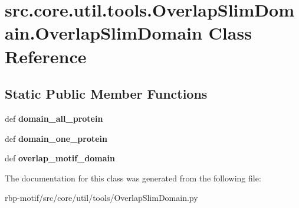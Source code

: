 \hypertarget{classsrc_1_1core_1_1util_1_1tools_1_1OverlapSlimDomain_1_1OverlapSlimDomain}{\section{src.\-core.\-util.\-tools.\-Overlap\-Slim\-Domain.\-Overlap\-Slim\-Domain Class Reference}
\label{classsrc_1_1core_1_1util_1_1tools_1_1OverlapSlimDomain_1_1OverlapSlimDomain}
}
\subsection*{Static Public Member Functions}
\begin{DoxyCompactItemize}
\item 
\hypertarget{classsrc_1_1core_1_1util_1_1tools_1_1OverlapSlimDomain_1_1OverlapSlimDomain_a35e8d3b7e4ba564c9db6f340cb02a3b6}{def {\bfseries domain\-\_\-all\-\_\-protein}}\label{classsrc_1_1core_1_1util_1_1tools_1_1OverlapSlimDomain_1_1OverlapSlimDomain_a35e8d3b7e4ba564c9db6f340cb02a3b6}

\item 
\hypertarget{classsrc_1_1core_1_1util_1_1tools_1_1OverlapSlimDomain_1_1OverlapSlimDomain_a3568e47fd6f59752775c297396d126e4}{def {\bfseries domain\-\_\-one\-\_\-protein}}\label{classsrc_1_1core_1_1util_1_1tools_1_1OverlapSlimDomain_1_1OverlapSlimDomain_a3568e47fd6f59752775c297396d126e4}

\item 
\hypertarget{classsrc_1_1core_1_1util_1_1tools_1_1OverlapSlimDomain_1_1OverlapSlimDomain_a3bc8f1020a24c11df401847eb61e467e}{def {\bfseries overlap\-\_\-motif\-\_\-domain}}\label{classsrc_1_1core_1_1util_1_1tools_1_1OverlapSlimDomain_1_1OverlapSlimDomain_a3bc8f1020a24c11df401847eb61e467e}

\end{DoxyCompactItemize}


The documentation for this class was generated from the following file\-:\begin{DoxyCompactItemize}
\item 
rbp-\/motif/src/core/util/tools/Overlap\-Slim\-Domain.\-py\end{DoxyCompactItemize}
